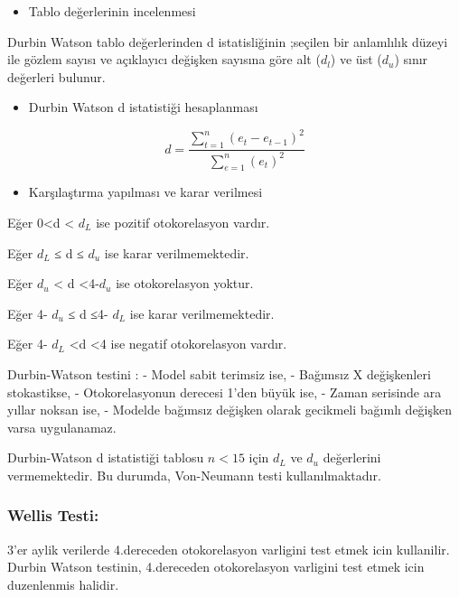 \documentclass[11pt]{article}
\providecommand{\tightlist}{%
      \setlength{\itemsep}{0pt}\setlength{\parskip}{0pt}}
\begin{document}
\begin{itemize}
\tightlist
\item
  Tablo değerlerinin incelenmesi
\end{itemize}

Durbin Watson tablo değerlerinden d istatisliğinin ;seçilen bir
anlamlılık düzeyi ile gözlem sayısı ve açıklayıcı değişken sayısına göre
alt (\(d_{l}\)) ve üst (\(d_{u}\)) sınır değerleri bulunur.

\begin{itemize}
\tightlist
\item
  Durbin Watson d istatistiği hesaplanması
\end{itemize}

\[  d = \frac{\sum_{t=1}^n (e_{t} -e_{t-1})^2}{\sum_{e=1}^n (e_{t})^2 } \]

\begin{itemize}
\tightlist
\item
  Karşılaştırma yapılması ve karar verilmesi
\end{itemize}

Eğer  0\textless{}d \textless{} \(d_{L}\)  ise pozitif otokorelasyon
vardır.

Eğer \(d_{L}\) ≤ d ≤ \(d_{u}\)  ise karar verilmemektedir.

Eğer \(d_{u}\) \textless{} d \textless{}4-\(d_{u}\) ise otokorelasyon
yoktur.

Eğer  4- \(d_{u}\) ≤ d ≤4- \(d_{L}\)  ise karar verilmemektedir.

Eğer  4- \(d_{L}\)  \textless{}d \textless{}4 ise negatif
otokorelasyon vardır.

Durbin-Watson testini : - Model sabit terimsiz ise, - Bağımsız X
değişkenleri stokastikse, - Otokorelasyonun derecesi 1'den büyük ise, -
Zaman serisinde ara yıllar noksan ise, - Modelde bağımsız değişken
olarak gecikmeli bağımlı değişken varsa uygulanamaz.

Durbin-Watson d istatistiği tablosu \(n<15\) için \(d_{L}\) ve \(d_{u}\)
değerlerini vermemektedir. Bu durumda, Von-Neumann testi
kullanılmaktadır.

\subsubsection{Wellis Testi:}\label{wellis-testi}

3'er aylik verilerde 4.dereceden otokorelasyon varligini test etmek icin
kullanilir. Durbin Watson testinin, 4.dereceden otokorelasyon varligini
test etmek icin duzenlenmis halidir.
\end{document}
